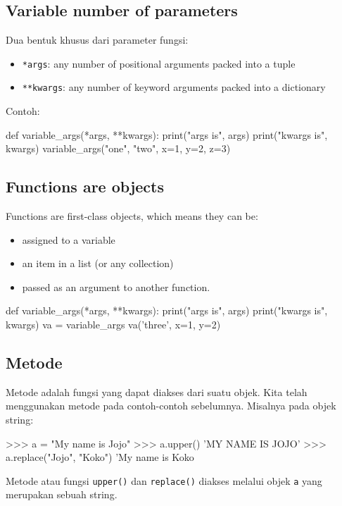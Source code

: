 \subsection{Variable number of parameters}

Dua bentuk khusus dari parameter fungsi:
\begin{itemize}
\item \verb|*args|: any number of positional arguments packed into a tuple
\item \verb|**kwargs|: any number of keyword arguments packed into a dictionary
\end{itemize}

Contoh:

\begin{pythoncode}
def variable_args(*args, **kwargs):
    print("args is", args)
    print("kwargs is", kwargs)
variable_args("one", "two", x=1, y=2, z=3)
\end{pythoncode}


\subsection{Functions are objects}

Functions are first-class objects, which means they can be:
\begin{itemize}
\item assigned to a variable
\item an item in a list (or any collection)
\item passed as an argument to another function.
\end{itemize}

\begin{pythoncode}
def variable_args(*args, **kwargs):
    print("args is", args)
    print("kwargs is", kwargs)
va = variable_args
va('three', x=1, y=2)
\end{pythoncode}

\subsection{Metode}

Metode adalah fungsi yang dapat diakses dari suatu objek.
Kita telah menggunakan metode pada contoh-contoh sebelumnya.
Misalnya pada objek string:
\begin{pyconcode}
>>> a = "My name is Jojo"
>>> a.upper()
'MY NAME IS JOJO'
>>> a.replace("Jojo", "Koko")
'My name is Koko
\end{pyconcode}
Metode atau fungsi \texttt{upper()} dan \texttt{replace()} diakses melalui objek
\texttt{a} yang merupakan sebuah string.


